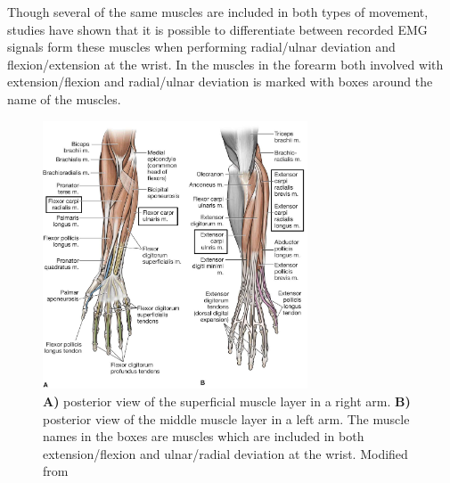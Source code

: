 Though several of the same muscles are included in both types of movement, studies have shown that it is possible to differentiate between recorded EMG signals form these muscles when performing radial/ulnar deviation and flexion/extension at the wrist. \cite{hahne2014} In  the muscles in the forearm both involved with extension/flexion and radial/ulnar deviation is marked with boxes around the name of the muscles. 

\begin{figure}[H]
	\includegraphics[width=0.7\textwidth]{figures/anatomy/all_the_muscles}  %
	\caption{\textbf{A)} posterior view of the superficial muscle layer in a right arm. \textbf{B)} posterior view of the middle muscle layer in a left arm. The muscle names in the boxes are muscles which are included in both extension/flexion and ulnar/radial deviation at the wrist. Modified from \cite{zezo2016}}
	\label{fig:ALL_THE_MUSCLES}  %
\end{figure}


